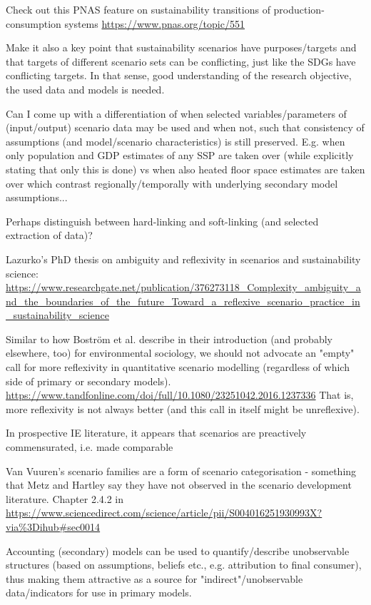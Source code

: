 \documentclass{article}
\begin{document}
Check out this PNAS feature on sustainability transitions of production-consumption systems \url{https://www.pnas.org/topic/551}

Make it also a key point that sustainability scenarios have purposes/targets and that targets of different scenario sets can be conflicting, just like the SDGs have conflicting targets. In that sense, good understanding of the research objective, the used data and models is needed.

Can I come up with a differentiation of when selected variables/parameters of (input/output) scenario data may be used and when not, such that consistency of assumptions (and model/scenario characteristics) is still preserved. E.g. when only population and GDP estimates of any SSP are taken over (while explicitly stating that only this is done) vs when also heated floor space estimates are taken over which contrast regionally/temporally with underlying secondary model assumptions...

Perhaps distinguish between hard-linking and soft-linking (and selected extraction of data)?

Lazurko's PhD thesis on ambiguity and reflexivity in scenarios and sustainability science: \url{https://www.researchgate.net/publication/376273118_Complexity_ambiguity_and_the_boundaries_of_the_future_Toward_a_reflexive_scenario_practice_in_sustainability_science}

Similar to how Boström et al. describe in their introduction (and probably elsewhere, too) for environmental sociology, we should not advocate an "empty" call for more reflexivity in quantitative scenario modelling (regardless of which side of primary or secondary models). \url{https://www.tandfonline.com/doi/full/10.1080/23251042.2016.1237336} That is, more reflexivity is not always better (and this call in itself might be unreflexive).

In prospective IE literature, it appears that scenarios are preactively commensurated, i.e. made comparable 

Van Vuuren's scenario families are a form of scenario categorisation - something that Metz and Hartley say they have not observed in the scenario development literature. Chapter 2.4.2 in \url{https://www.sciencedirect.com/science/article/pii/S004016251930993X?via%3Dihub#sec0014}

Accounting (secondary) models can be used to quantify/describe unobservable structures (based on assumptions, beliefs etc., e.g. attribution to final consumer), thus making them attractive as a source for "indirect"/unobservable data/indicators for use in primary models.
\end{document}
